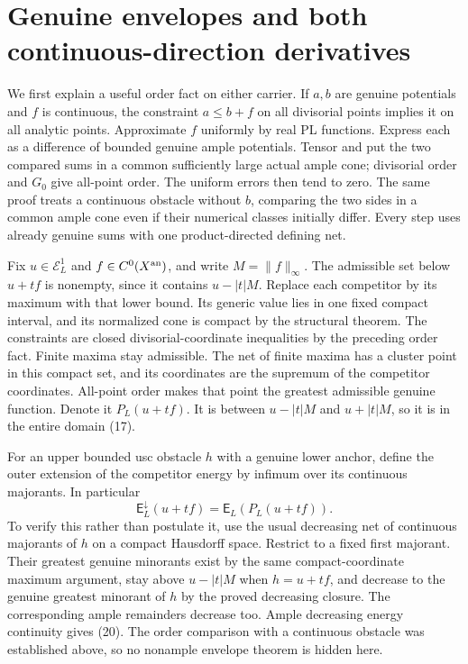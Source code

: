 \documentclass[11pt]{article}
\begin{document}
\section{Genuine envelopes and both continuous-direction derivatives}
We first explain a useful order fact on either carrier. If $a,b$
are genuine potentials and $f$ is continuous, the constraint
$a\leq b+f$ on all divisorial points implies it on all analytic
points. Approximate $f$ uniformly by real PL functions. Express
each as a difference of bounded genuine ample potentials. Tensor
and put the two compared sums in a common sufficiently large
actual ample cone; divisorial order and $G_0$ give all-point order.
The uniform errors then tend to zero. The same proof treats a
continuous obstacle without $b$, comparing the two sides in a
common ample cone even if their numerical classes initially differ.
Every step uses already genuine sums with one product-directed
defining net.

Fix $u\in\mathcal E_L^1$ and $f\in C^0(X^{\rm an})$, and write
$M=\|f\|_\infty$. The admissible set below $u+tf$ is nonempty,
since it contains $u-|t|M$. Replace each competitor by its maximum
with that lower bound. Its generic value lies in one fixed compact
interval, and its normalized cone is compact by the structural
theorem. The constraints are closed divisorial-coordinate
inequalities by the preceding order fact. Finite maxima stay
admissible. The net of finite maxima has a cluster point in this
compact set, and its coordinates are the supremum of the
competitor coordinates. All-point order makes that point the
greatest admissible genuine function. Denote it
$P_L(u+tf)$. It is between $u-|t|M$ and $u+|t|M$, so it is
in the entire domain (17).

For an upper bounded usc obstacle $h$ with a genuine lower anchor,
define the outer extension
of the competitor energy by infimum over its continuous majorants.
In particular
\[
 \mathsf E_L^\downarrow(u+tf)=\mathsf E_L(P_L(u+tf)).       \tag{20}
\]
To verify this rather than postulate it, use the usual decreasing
net of continuous majorants of $h$ on a compact Hausdorff space.
Restrict to a fixed first majorant. Their greatest genuine minorants
exist by the same compact-coordinate maximum argument, stay above
$u-|t|M$ when $h=u+tf$, and decrease to the genuine greatest
minorant of $h$ by the proved decreasing closure. The corresponding
ample remainders decrease too. Ample decreasing energy continuity
gives (20). The order comparison with a continuous obstacle was
established above, so no nonample envelope theorem is hidden here.
\end{document}
